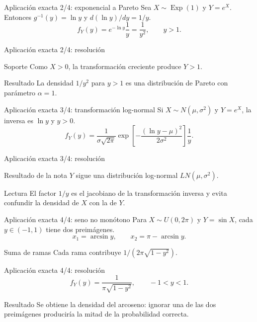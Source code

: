 \documentclass[10pt,aspectratio=169]{beamer}
\begin{document}
\begin{frame}{Aplicación exacta 2/4: exponencial a Pareto}
  \footnotesize
  Sea $X\sim\operatorname{Exp}(1)$ y $Y=e^X$. Entonces $g^{-1}(y)=\ln y$ y
  $d(\ln y)/dy=1/y$.
  \[
    f_Y(y)=e^{-\ln y}\frac1y=\frac1{y^2},\qquad y>1.
  \]
\end{frame}

\begin{frame}{Aplicación exacta 2/4: resolución}
  \footnotesize
  \begin{block}{Soporte}
    Como $X>0$, la transformación creciente produce $Y>1$.
  \end{block}
  \begin{alertblock}{Resultado}
    La densidad $1/y^2$ para $y>1$ es una distribución de Pareto con
    parámetro $\alpha=1$.
  \end{alertblock}
\end{frame}

\begin{frame}{Aplicación exacta 3/4: transformación log-normal}
  \footnotesize
  Si $X\sim N(\mu,\sigma^2)$ y $Y=e^X$, la inversa es $\ln y$ y $y>0$.
  \[
    f_Y(y)=\frac{1}{\sigma\sqrt{2\pi}}
    \exp\!\left[-\frac{(\ln y-\mu)^2}{2\sigma^2}\right]\frac1y.
  \]
\end{frame}

\begin{frame}{Aplicación exacta 3/4: resolución}
  \footnotesize
  \begin{block}{Resultado de la nota}
    $Y$ sigue una distribución log-normal $LN(\mu,\sigma^2)$.
  \end{block}
  \begin{exampleblock}{Lectura}
    El factor $1/y$ es el jacobiano de la transformación inversa y evita
    confundir la densidad de $X$ con la de $Y$.
  \end{exampleblock}
\end{frame}

\begin{frame}{Aplicación exacta 4/4: seno no monótono}
  \footnotesize
  Para $X\sim U(0,2\pi)$ y $Y=\sin X$, cada $y\in(-1,1)$ tiene dos preimágenes.
  \[
    x_1=\arcsin y,\qquad x_2=\pi-\arcsin y.
  \]
  \begin{block}{Suma de ramas}
    Cada rama contribuye $1/(2\pi\sqrt{1-y^2})$.
  \end{block}
\end{frame}

\begin{frame}{Aplicación exacta 4/4: resolución}
  \footnotesize
  \[
    f_Y(y)=\frac{1}{\pi\sqrt{1-y^2}},\qquad -1<y<1.
  \]
  \begin{alertblock}{Resultado}
    Se obtiene la densidad del arcoseno: ignorar una de las dos preimágenes
    produciría la mitad de la probabilidad correcta.
  \end{alertblock}
\end{frame}
\end{document}
